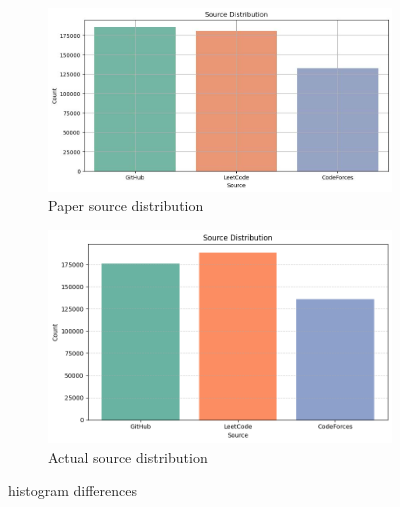 
\begin{figure}[h]
    \centering
    \begin{subfigure}[b]{0.45\textwidth}
        \centering
        \includegraphics[width=\linewidth]{img/CoDet-M4/origianl_histogram_source_distribution.jpeg}
        \caption{Paper source distribution}
        \label{fig:immagine1}
    \end{subfigure}
    \hfill
    \begin{subfigure}[b]{0.45\textwidth}
        \centering
        \includegraphics[width=\linewidth]{img/CoDet-M4/histogram_source_distribution_MY.png}
        \caption{Actual source distribution}
        \label{fig:immagine2}
    \end{subfigure}
    \caption{histogram differences}
    \label{fig:CoDet-M4_histogram_differences}
\end{figure}



